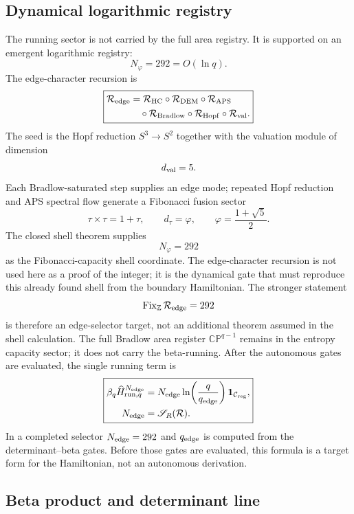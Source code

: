 \documentclass[aps,prd,reprint,nofootinbib,superscriptaddress,floatfix]{revtex4-2}
\numberwithin{equation}{section}
\theoremstyle{definition}
\theoremstyle{plain}
\begin{document}
\subsection{Dynamical logarithmic registry}

The running sector is not carried by the full area registry.  It is supported
on an emergent logarithmic registry:
\[
\boxed{
N_\varphi=292=O(\ln q).
}
\]
The edge-character recursion is
\[
\boxed{
\begin{aligned}
\mathcal R_{\rm edge}
&=
\mathcal R_{\rm HC}
\circ\mathcal R_{\rm DEM}
\circ\mathcal R_{\rm APS}
\\
&\quad
\circ\mathcal R_{\rm Bradlow}
\circ\mathcal R_{\rm Hopf}
\circ\mathcal R_{\rm val}.
\end{aligned}
}
\]
The seed is the Hopf reduction \(S^3\to S^2\) together with the valuation
module of dimension
\[
d_{\rm val}=5.
\]
Each Bradlow-saturated step supplies an edge mode; repeated Hopf reduction and
APS spectral flow generate a Fibonacci fusion sector
\[
\tau\times\tau=1+\tau,
\qquad
d_\tau=\varphi,
\qquad
\varphi=\frac{1+\sqrt5}{2}.
\]
The closed shell theorem supplies
\[
\boxed{N_\varphi=292}
\]
as the Fibonacci-capacity shell coordinate.  The edge-character recursion is
not used here as a proof of the integer; it is the dynamical gate that must
reproduce this already found shell from the boundary Hamiltonian.  The
stronger statement
\[
\operatorname{Fix}_{\mathbb Z}\mathcal R_{\rm edge}=292
\]
is therefore an edge-selector target, not an additional theorem assumed in the
shell calculation.  The full Bradlow area register
\(\mathbb{CP}^{q-1}\) remains in the entropy capacity sector; it does not carry
the beta-running.  After the autonomous gates are evaluated, the single running term is
\[
\boxed{
\begin{aligned}
\beta_q\widehat H_{{\rm run},q}^{N_{\rm edge}}
&=
N_{\rm edge}
\ln\!\left(\frac{q}{q_{\rm edge}}\right)
\mathbf 1_{\mathcal C_{\rm reg}},\\
N_{\rm edge}&=\mathscr S_R(\mathcal R).
\end{aligned}
}
\]
In a completed selector \(N_{\rm edge}=292\) and \(q_{\rm edge}\) is computed
from the determinant--beta gates.  Before those gates are evaluated, this
formula is a target form for the Hamiltonian, not an autonomous derivation.

\subsection{Beta product and determinant line}
\end{document}
